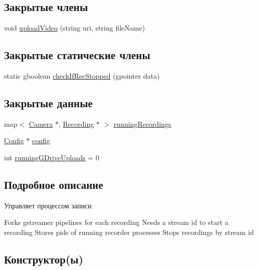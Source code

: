 \subsection*{Закрытые члены}
\begin{DoxyCompactItemize}
\item 
void \hyperlink{class_recorder_a2decf81333499f7c9f0193daed7e2091}{upload\+Video} (string uri, string file\+Name)
\end{DoxyCompactItemize}
\subsection*{Закрытые статические члены}
\begin{DoxyCompactItemize}
\item 
static gboolean \hyperlink{class_recorder_a1fdebd3d390713fcafe6c76635760841}{check\+If\+Rec\+Stopped} (gpointer data)
\end{DoxyCompactItemize}
\subsection*{Закрытые данные}
\begin{DoxyCompactItemize}
\item 
map$<$ \hyperlink{struct_camera}{Camera} $\ast$, \hyperlink{class_recording}{Recording} $\ast$ $>$ \hyperlink{class_recorder_a36bc2c958b17808861bd6f8b4204c82e}{running\+Recordings}
\item 
\hyperlink{class_config}{Config} $\ast$ \hyperlink{class_recorder_acc5a095c1d30b547c994f817438c054b}{config}
\item 
int \hyperlink{class_recorder_ae18bfd225286a1ebcd3b49de32d129cb}{running\+G\+Drive\+Uploads} = 0
\end{DoxyCompactItemize}


\subsection{Подробное описание}
Управляет процессом записи 

Forks gstreamer pipelines for each recording Needs a stream id to start a recording Stores pids of running recorder processes Stops recordings by stream id 

\subsection{Конструктор(ы)}
\mbox{\label{class_recorder_aa3cf7e6df22a7a21e8939e1dc1d02ea1}} 
